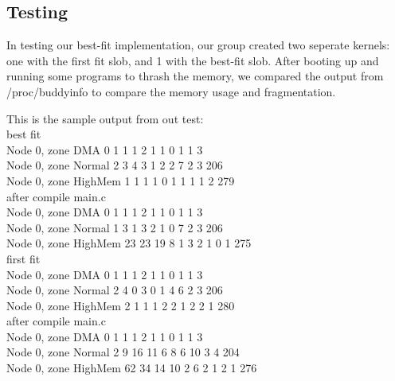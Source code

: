 \documentclass[letterpaper,10pt,titlepage]{article}
\begin{document}
\subsection*{Testing} 

In testing our best-fit implementation, our group created two seperate kernels: one with the first fit slob, and 1 with the best-fit slob. After booting up and running some programs to thrash the memory, we compared the output from /proc/buddyinfo to compare the memory usage and fragmentation.

This is the sample output from out test:\\
best fit\\
Node 0, zone      DMA      0      1      1      1      2      1      1      0      1      1      3 \\
Node 0, zone   Normal      2      3      4      3      1      2      2      7      2      3    206 \\
Node 0, zone  HighMem      1      1      1      1      0      1      1      1      1      2    279 \\

after compile main.c\\
Node 0, zone      DMA      0      1      1      1      2      1      1      0      1      1      3 \\
Node 0, zone   Normal      1      3      1      3      2      1      0      7      2      3    206 \\
Node 0, zone  HighMem     23     23     19      8      1      3      2      1      0      1    275 \\

first fit\\
Node 0, zone      DMA      0      1      1      1      2      1      1      0      1      1      3 \\
Node 0, zone   Normal      2      4      0      3      0      1      4      6      2      3    206 \\
Node 0, zone  HighMem      2      1      1      1      2      2      1      2      2      1    280 \\

after compile main.c\\
Node 0, zone      DMA      0      1      1      1      2      1      1      0      1      1      3 \\
Node 0, zone   Normal      2      9     16     11      6      8      6     10      3      4    204 \\
Node 0, zone  HighMem     62     34     14     10      2      6      2      1      2      1    276 \\
\end{document}
